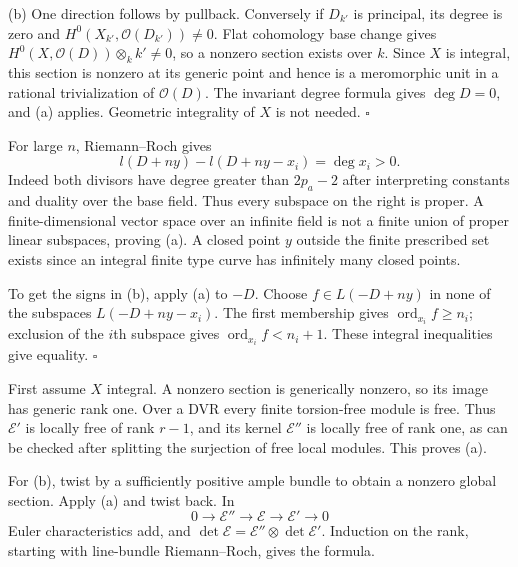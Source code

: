 \documentclass[11pt]{article}
\let\chapterexercise\exercise
\renewcommand{\exercise}[2]{\Needspace{8\baselineskip}\chapterexercise{#1}{#2}}
\begin{document}
(b) One direction follows by pullback. Conversely if $D_{k'}$ is principal, its degree is zero and $H^0(X_{k'},\mathcal O(D_{k'}))\ne0$. Flat cohomology base change gives $H^0(X,\mathcal O(D))\otimes_kk'\ne0$, so a nonzero section exists over $k$. Since $X$ is integral, this section is nonzero at its generic point and hence is a meromorphic unit in a rational trivialization of $\mathcal O(D)$. The invariant degree formula gives $\deg D=0$, and (a) applies. Geometric integrality of $X$ is not needed. \hfill$\square$

\pf
For large $n$, Riemann--Roch gives
\[ l(D+ny)-l(D+ny-x_i)=\deg x_i>0. \]
Indeed both divisors have degree greater than $2p_a-2$ after interpreting constants and duality over the base field. Thus every subspace on the right is proper. A finite-dimensional vector space over an infinite field is not a finite union of proper linear subspaces, proving (a). A closed point $y$ outside the finite prescribed set exists since an integral finite type curve has infinitely many closed points.

To get the signs in (b), apply (a) to $-D$. Choose $f\in L(-D+ny)$ in none of the subspaces $L(-D+ny-x_i)$. The first membership gives $\operatorname{ord}_{x_i}f\ge n_i$; exclusion of the $i$th subspace gives $\operatorname{ord}_{x_i}f<n_i+1$. These integral inequalities give equality. \hfill$\square$

\pf
First assume $X$ integral. A nonzero section is generically nonzero, so its image has generic rank one. Over a DVR every finite torsion-free module is free. Thus $\mathcal E'$ is locally free of rank $r-1$, and its kernel $\mathcal E''$ is locally free of rank one, as can be checked after splitting the surjection of free local modules. This proves (a).

For (b), twist by a sufficiently positive ample bundle to obtain a nonzero global section. Apply (a) and twist back. In
\[ 0\to\mathcal E''\to\mathcal E\to\mathcal E'\to0 \]
Euler characteristics add, and $\det\mathcal E=\mathcal E''\otimes\det\mathcal E'$. Induction on the rank, starting with line-bundle Riemann--Roch, gives the formula.
\end{document}

